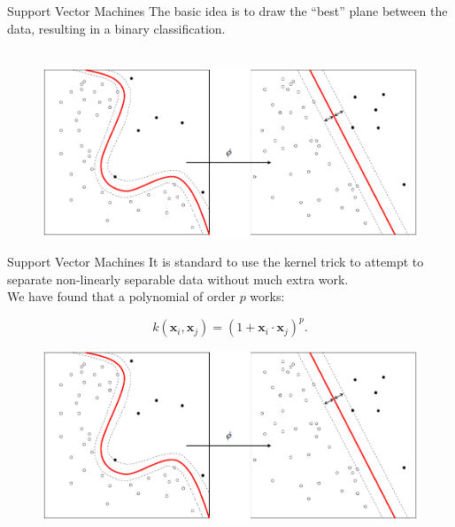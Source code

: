 \documentclass[xcolor=dvipsnames,t]{beamer} %
\begin{document}
\begin{frame}{Support Vector Machines}
   The basic idea is to draw the ``best'' plane between the data, resulting in a binary classification.\\

~\\[3em] %
\begin{figure}[b]
   \centering
   \includegraphics[width=\textwidth]{figures/Kernel_Machine_public.png}
\end{figure}
\end{frame}

\begin{frame}{Support Vector Machines}
It is standard to use the kernel trick to attempt to separate non-linearly separable data without much extra work.\\

We have found that a polynomial of order $p$ works:

\[ k(\mathbf{x}_i,\mathbf{x}_j) = \left(1 + \mathbf{x}_i\cdot\mathbf{x}_j\right)^p. \] 

\begin{figure}[b]
   \centering
   \includegraphics[width=\textwidth]{figures/Kernel_Machine_public.png}
\end{figure}
\end{frame}
\end{document}

